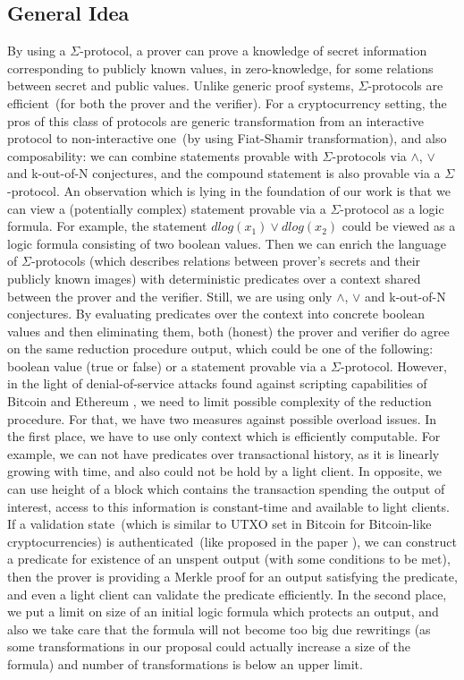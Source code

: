 \documentclass[]{llncs}
\newcommand{\authnote}[2]{\marginpar{\parbox{\marginparwidth}{\tiny %
  \textsf{#1 {\textcolor{blue}{notes: #2}}}}}%
  \textcolor{blue}{\textbf{\dag}}}
\newcommand{\authnote}[2]{
  \textsf{#1 \textcolor{blue}{: #2}}}
\newcommand{\authnote}[2]{}
\newcommand{\knote}[1]{{\authnote{\textcolor{green}{kushti notes}}{#1}}}
\begin{document}
\subsection{General Idea}

By using a $\Sigma$-protocol, a prover can prove a knowledge of secret information corresponding to publicly known values, in zero-knowledge, for some relations between secret and public values. Unlike generic proof systems, $\Sigma$-protocols are efficient~(for both the prover and the verifier). For a cryptocurrency setting, the pros of this class of protocols are generic transformation from an interactive protocol to non-interactive one~(by using Fiat-Shamir transformation), and also composability: we can combine statements provable with $\Sigma$-protocols via $\land$, $\lor$ and k-out-of-N conjectures, and the compound statement is also provable via a $\Sigma$-protocol. An observation which is lying in the foundation of our work is that we can view a (potentially complex) statement provable via a $\Sigma$-protocol as a logic formula. For example, the statement $dlog(x_1) \lor dlog(x_2)$ could be viewed as a logic formula consisting of two boolean values. Then we can enrich the language of $\Sigma$-protocols (which describes relations between prover's secrets and their publicly known images) with deterministic predicates over a context shared between the prover and the verifier. Still, we are using only $\land$, $\lor$ and k-out-of-N conjectures. By evaluating predicates over the context into concrete boolean values and then eliminating them, both (honest) the prover and verifier do agree on the same reduction procedure output, which could be one of the following: boolean value (true or false) or a statement provable via a $\Sigma$-protocol. However, in the light of denial-of-service attacks found against scripting capabilities of Bitcoin and Ethereum \knote{todo: links}, we need to limit possible complexity of the reduction procedure. For that, we have two measures against possible overload issues. In the first place, we have to use only context which is efficiently computable. For example, we can not have predicates over transactional history, as it is linearly growing with time, and also could not be hold by a light client. In opposite, we can use height of a block which contains the transaction spending the output of interest, access to this information is constant-time and available to light clients. If a validation state~(which is similar to UTXO set in Bitcoin for Bitcoin-like cryptocurrencies) is authenticated~(like proposed in the paper \knote{cite AVL paper}), we can construct a predicate for existence of an unspent output (with some conditions to be met), then the prover is providing a Merkle proof for an output satisfying the predicate, and even a light client can validate the predicate efficiently. In the second place, we put a limit on size of an initial logic formula which protects an output, and also we take care that the formula will not become too big due rewritings (as some transformations in our proposal could actually increase a size of the formula) and number of transformations is below an upper limit.
\end{document}
